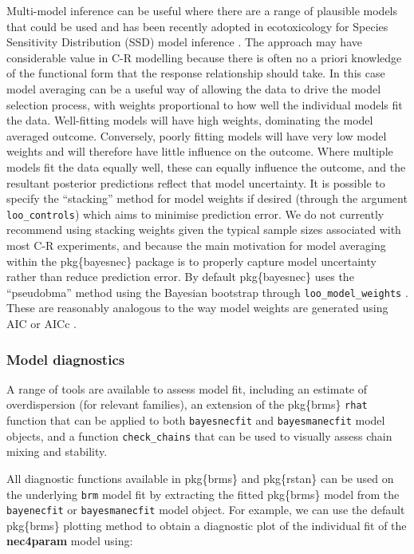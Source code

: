 \documentclass[
]{jss}
\begin{document}
Multi-model inference can be useful where there are a range of plausible
models that could be used \citep{Burnham2002} and has been recently
adopted in ecotoxicology for Species Sensitivity Distribution (SSD)
model inference \citep{Thorley2018, fox2020, Dalgarno}. The approach may
have considerable value in C-R modelling because there is often no a
priori knowledge of the functional form that the response relationship
should take. In this case model averaging can be a useful way of
allowing the data to drive the model selection process, with weights
proportional to how well the individual models fit the data.
Well-fitting models will have high weights, dominating the model
averaged outcome. Conversely, poorly fitting models will have very low
model weights and will therefore have little influence on the outcome.
Where multiple models fit the data equally well, these can equally
influence the outcome, and the resultant posterior predictions reflect
that model uncertainty. It is possible to specify the ``stacking''
method \citep{Yao2018} for model weights if desired (through the
argument \texttt{loo\_controls}) which aims to minimise prediction
error. We do not currently recommend using stacking weights given the
typical sample sizes associated with most C-R experiments, and because
the main motivation for model averaging within the pkg\{bayesnec\}
package is to properly capture model uncertainty rather than reduce
prediction error. By default pkg\{bayesnec\} uses the ``pseudobma''
method using the Bayesian bootstrap through \texttt{loo\_model\_weights}
\citep{vehtari2020, vehtari2017}. These are reasonably analogous to the
way model weights are generated using AIC or AICc \citep{Burnham2002}.

\hypertarget{model-diagnostics}{%
\subsubsection{Model diagnostics}\label{model-diagnostics}}

A range of tools are available to assess model fit, including an
estimate of overdispersion (for relevant families), an extension of the
pkg\{brms\} \texttt{rhat} function that can be applied to both
\texttt{bayesnecfit} and \texttt{bayesmanecfit} model objects, and a
function \texttt{check\_chains} that can be used to visually assess
chain mixing and stability.

All diagnostic functions available in pkg\{brms\} and pkg\{rstan\} can
be used on the underlying \texttt{brm} model fit by extracting the
fitted pkg\{brms\} model from the \texttt{bayenecfit} or
\texttt{bayesmanecfit} model object. For example, we can use the default
pkg\{brms\} plotting method to obtain a diagnostic plot of the
individual fit of the \textbf{nec4param} model using:
\end{document}
